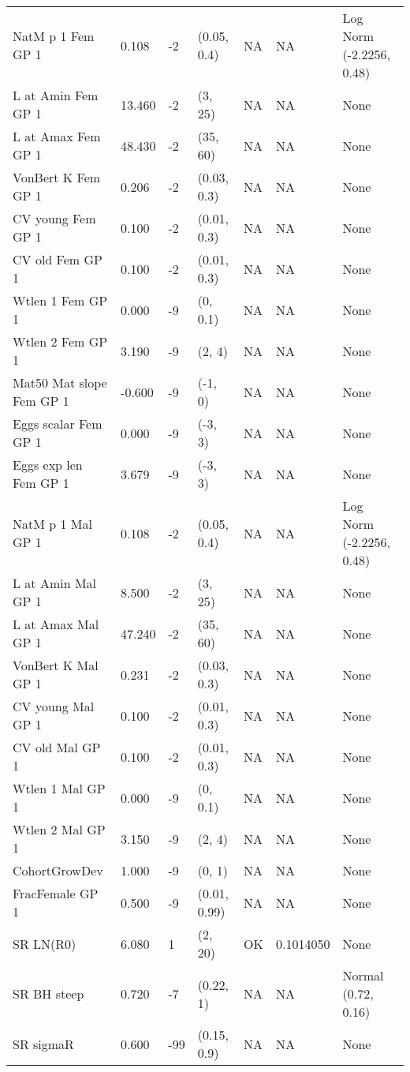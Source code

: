 \documentclass[11pt,
  english,
  a4paper,
]{article}
\begin{document}
\begin{landscape}
\begin{longtable}[t]{>{\raggedright\arraybackslash}p{6cm}lllll>{\raggedright\arraybackslash}p{4cm}}
\endfoot
\bottomrule
\endlastfoot
NatM p 1 Fem GP 1 & 0.108 & -2 & (0.05, 0.4) & NA & NA & Log Norm (-2.2256, 0.48)\\
L at Amin Fem GP 1 & 13.460 & -2 & (3, 25) & NA & NA & None\\
L at Amax Fem GP 1 & 48.430 & -2 & (35, 60) & NA & NA & None\\
VonBert K Fem GP 1 & 0.206 & -2 & (0.03, 0.3) & NA & NA & None\\
CV young Fem GP 1 & 0.100 & -2 & (0.01, 0.3) & NA & NA & None\\
CV old Fem GP 1 & 0.100 & -2 & (0.01, 0.3) & NA & NA & None\\
Wtlen 1 Fem GP 1 & 0.000 & -9 & (0, 0.1) & NA & NA & None\\
Wtlen 2 Fem GP 1 & 3.190 & -9 & (2, 4) & NA & NA & None\\
Mat50%
Mat slope Fem GP 1 & -0.600 & -9 & (-1, 0) & NA & NA & None\\
Eggs scalar Fem GP 1 & 0.000 & -9 & (-3, 3) & NA & NA & None\\
Eggs exp len Fem GP 1 & 3.679 & -9 & (-3, 3) & NA & NA & None\\
NatM p 1 Mal GP 1 & 0.108 & -2 & (0.05, 0.4) & NA & NA & Log Norm (-2.2256, 0.48)\\
L at Amin Mal GP 1 & 8.500 & -2 & (3, 25) & NA & NA & None\\
L at Amax Mal GP 1 & 47.240 & -2 & (35, 60) & NA & NA & None\\
VonBert K Mal GP 1 & 0.231 & -2 & (0.03, 0.3) & NA & NA & None\\
CV young Mal GP 1 & 0.100 & -2 & (0.01, 0.3) & NA & NA & None\\
CV old Mal GP 1 & 0.100 & -2 & (0.01, 0.3) & NA & NA & None\\
Wtlen 1 Mal GP 1 & 0.000 & -9 & (0, 0.1) & NA & NA & None\\
Wtlen 2 Mal GP 1 & 3.150 & -9 & (2, 4) & NA & NA & None\\
CohortGrowDev & 1.000 & -9 & (0, 1) & NA & NA & None\\
FracFemale GP 1 & 0.500 & -9 & (0.01, 0.99) & NA & NA & None\\
SR LN(R0) & 6.080 & 1 & (2, 20) & OK & 0.1014050 & None\\
SR BH steep & 0.720 & -7 & (0.22, 1) & NA & NA & Normal (0.72, 0.16)\\
SR sigmaR & 0.600 & -99 & (0.15, 0.9) & NA & NA & None\\

\end{longtable}
\end{landscape}
\end{document}
